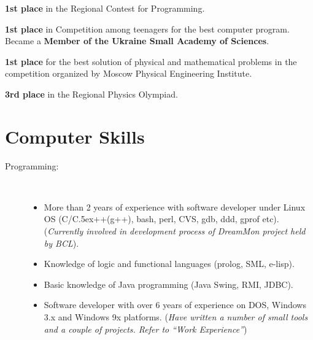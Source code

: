 \documentclass[10pt,overlapped,line]{res}
\def\Cplusplus{{\rm C\raise.5ex\hbox{\small ++}}}
\newcommand{\mplace}[1]{\textbf{#1}}
\newcommand{\wdescription}[1]{({\small \textit{#1}})}
\begin{document}
\begin{resume}
\begin{position}
\mplace{1st place} in the Regional Contest for Programming.
\end{position}

\begin{position}
  \mplace{1st place} in Competition among teenagers for the best
  computer program. Became a \mplace{Member of the Ukraine Small Academy
    of Sciences}.
\end{position}

\begin{position}
  \mplace{1st place} for the best solution of physical and mathematical
  problems in the competition organized by Moscow Physical Engineering Institute.
\end{position}

\begin{position}
  \mplace{3rd place} in the Regional Physics Olympiad.

\end{position}

\section{Computer Skills}
 \begin{description}
   \item[Programming:] \hspace*{\fill} \\
     \begin{itemize}
     \item More than 2 years of experience with software developer
       under Linux OS (C/\Cplusplus(g++), bash, perl, CVS, gdb, ddd,
       gprof etc).  \wdescription{Currently involved in development
         process of DreamMon project held by BCL}.

     \item Knowledge of logic and functional languages (prolog, SML, e-lisp).

     \item Basic knowledge of Java programming (Java Swing, RMI,
       JDBC).

     \item Software developer with over 6 years of experience on DOS,
       Windows 3.x and Windows 9x platforms.
       \wdescription{Have written a number of small tools and a couple of
         projects. Refer to ``Work Experience''}
     

\end{itemize}
\end{description}
\end{resume}
\end{document}
